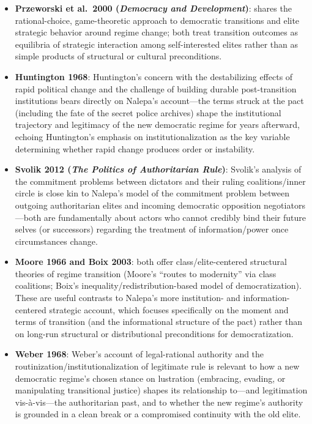 \documentclass[12pt]{article}
\begin{document}
\begin{itemize}[leftmargin=*, itemsep=4pt]
    \item \textbf{Przeworski et al.\ 2000 (\textit{Democracy and Development})}: shares the rational-choice, game-theoretic approach to democratic transitions and elite strategic behavior around regime change; both treat transition outcomes as equilibria of strategic interaction among self-interested elites rather than as simple products of structural or cultural preconditions.
    \item \textbf{Huntington 1968}: Huntington's concern with the destabilizing effects of rapid political change and the challenge of building durable post-transition institutions bears directly on Nalepa's account---the terms struck at the pact (including the fate of the secret police archives) shape the institutional trajectory and legitimacy of the new democratic regime for years afterward, echoing Huntington's emphasis on institutionalization as the key variable determining whether rapid change produces order or instability.
    \item \textbf{Svolik 2012 (\textit{The Politics of Authoritarian Rule})}: Svolik's analysis of the commitment problems between dictators and their ruling coalitions/inner circle is close kin to Nalepa's model of the commitment problem between outgoing authoritarian elites and incoming democratic opposition negotiators---both are fundamentally about actors who cannot credibly bind their future selves (or successors) regarding the treatment of information/power once circumstances change.
    \item \textbf{Moore 1966 and Boix 2003}: both offer class/elite-centered structural theories of regime transition (Moore's ``routes to modernity'' via class coalitions; Boix's inequality/redistribution-based model of democratization). These are useful contrasts to Nalepa's more institution- and information-centered strategic account, which focuses specifically on the moment and terms of transition (and the informational structure of the pact) rather than on long-run structural or distributional preconditions for democratization.
    \item \textbf{Weber 1968}: Weber's account of legal-rational authority and the routinization/institutionalization of legitimate rule is relevant to how a new democratic regime's chosen stance on lustration (embracing, evading, or manipulating transitional justice) shapes its relationship to---and legitimation vis-\`a-vis---the authoritarian past, and to whether the new regime's authority is grounded in a clean break or a compromised continuity with the old elite.

\end{itemize}
\end{document}
